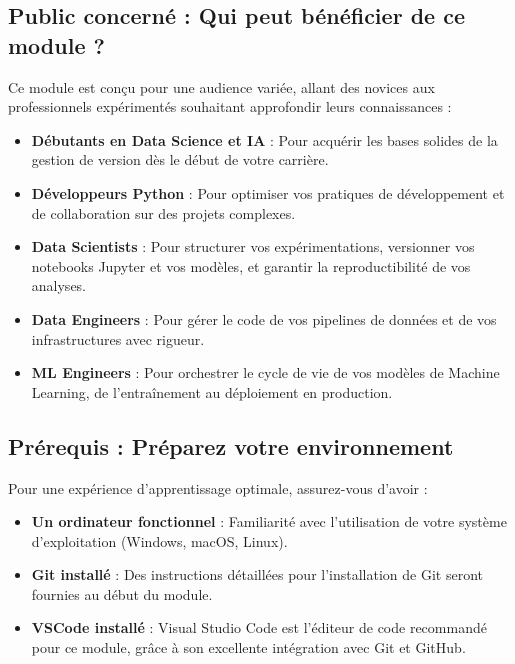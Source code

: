 \documentclass[
  letterpaper,
  DIV=11,
  numbers=noendperiod]{scrreprt}
\providecommand{\tightlist}{%
  \setlength{\itemsep}{0pt}\setlength{\parskip}{0pt}}
\begin{document}
\subsection{Public concerné : Qui peut bénéficier de ce module
?}\label{public-concernuxe9-qui-peut-buxe9nuxe9ficier-de-ce-module}

Ce module est conçu pour une audience variée, allant des novices aux
professionnels expérimentés souhaitant approfondir leurs connaissances :

\begin{itemize}
\tightlist
\item
  \textbf{Débutants en Data Science et IA} : Pour acquérir les bases
  solides de la gestion de version dès le début de votre carrière.
\item
  \textbf{Développeurs Python} : Pour optimiser vos pratiques de
  développement et de collaboration sur des projets complexes.
\item
  \textbf{Data Scientists} : Pour structurer vos expérimentations,
  versionner vos notebooks Jupyter et vos modèles, et garantir la
  reproductibilité de vos analyses.
\item
  \textbf{Data Engineers} : Pour gérer le code de vos pipelines de
  données et de vos infrastructures avec rigueur.
\item
  \textbf{ML Engineers} : Pour orchestrer le cycle de vie de vos modèles
  de Machine Learning, de l'entraînement au déploiement en production.
\end{itemize}

\subsection{Prérequis : Préparez votre
environnement}\label{pruxe9requis-pruxe9parez-votre-environnement}

Pour une expérience d'apprentissage optimale, assurez-vous d'avoir :

\begin{itemize}
\tightlist
\item
  \textbf{Un ordinateur fonctionnel} : Familiarité avec l'utilisation de
  votre système d'exploitation (Windows, macOS, Linux).
\item
  \textbf{Git installé} : Des instructions détaillées pour
  l'installation de Git seront fournies au début du module.
\item
  \textbf{VSCode installé} : Visual Studio Code est l'éditeur de code
  recommandé pour ce module, grâce à son excellente intégration avec Git
  et GitHub.
\end{itemize}
\end{document}

